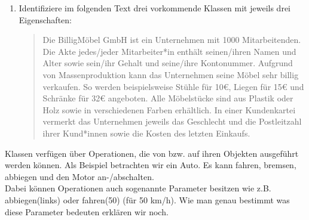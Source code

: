 \begin{enumerate}
    \item Identifiziere im folgenden Text drei vorkommende Klassen mit jeweils drei Eigenschaften:

    \begin{quotation}
        Die BilligMöbel GmbH ist ein Unternehmen mit 1000 Mitarbeitenden.
        Die Akte jedes/jeder Mitarbeiter*in enthält seinen/ihren Namen und Alter sowie sein/ihr Gehalt und seine/ihre Kontonummer.
        Aufgrund von Massenproduktion kann das Unternehmen seine Möbel sehr billig verkaufen.
        So werden beispielsweise Stühle für 10€, Liegen für 15€ und Schränke für 32€ angeboten.
        Alle Möbelstücke sind aus Plastik oder Holz sowie in verschiedenen Farben erhältlich.
        In einer Kundenkartei vermerkt das Unternehmen jeweils das Geschlecht und die Postleitzahl ihrer Kund*innen sowie die Kosten des letzten Einkaufs.
    \end{quotation}
\end{enumerate}

\begin{Infobox}
    Klassen verfügen über Operationen, die von bzw. auf ihren Objekten ausgeführt werden können.
    Als Beispiel betrachten wir ein Auto. Es kann fahren, bremsen, abbiegen und den Motor an-/abschalten.\\

    Dabei können Operationen auch sogenannte Parameter besitzen wie z.B. abbiegen(links) oder fahren(50) (für 50 km/h).
    Wie man genau bestimmt was diese Parameter bedeuten erklären wir noch.
\end{Infobox}

